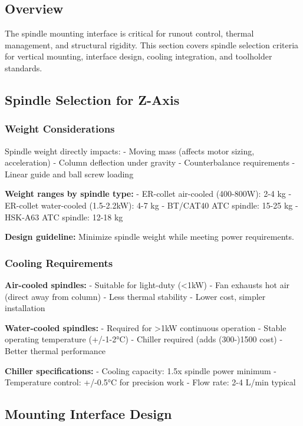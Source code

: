 \documentclass[
]{article}
\begin{document}
\subsection{Overview}\label{overview-4}

The spindle mounting interface is critical for runout control, thermal
management, and structural rigidity. This section covers spindle
selection criteria for vertical mounting, interface design, cooling
integration, and toolholder standards.

\subsection{Spindle Selection for
Z-Axis}\label{spindle-selection-for-z-axis}

\subsubsection{Weight Considerations}\label{weight-considerations}

Spindle weight directly impacts: - Moving mass (affects motor sizing,
acceleration) - Column deflection under gravity - Counterbalance
requirements - Linear guide and ball screw loading

\textbf{Weight ranges by spindle type:} - ER-collet air-cooled
(400-800W): 2-4 kg - ER-collet water-cooled (1.5-2.2kW): 4-7 kg -
BT/CAT40 ATC spindle: 15-25 kg - HSK-A63 ATC spindle: 12-18 kg

\textbf{Design guideline:} Minimize spindle weight while meeting power
requirements.

\subsubsection{Cooling Requirements}\label{cooling-requirements}

\textbf{Air-cooled spindles:} - Suitable for light-duty (\textless1kW) -
Fan exhausts hot air (direct away from column) - Less thermal stability
- Lower cost, simpler installation

\textbf{Water-cooled spindles:} - Required for \textgreater1kW
continuous operation - Stable operating temperature (+/-1-2°C) - Chiller
required (adds (300-)1500 cost) - Better thermal performance

\textbf{Chiller specifications:} - Cooling capacity: 1.5x spindle power
minimum - Temperature control: +/-0.5°C for precision work - Flow rate:
2-4 L/min typical

\subsection{Mounting Interface Design}\label{mounting-interface-design}
\end{document}

